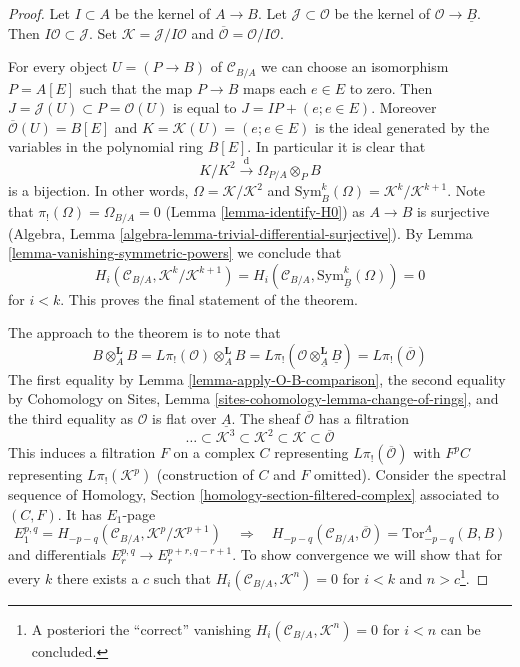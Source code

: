\documentclass[10pt,a4paper]{amsart}
\theoremstyle{plain}
\theoremstyle{definition}
\theoremstyle{remark}
\numberwithin{equation}{subsection}
\begin{document}
\begin{proof}
Let $I \subset A$ be the kernel of $A \to B$. Let
$\mathcal{J} \subset \mathcal{O}$
be the kernel of $\mathcal{O} \to \underline{B}$. Then
$I\mathcal{O} \subset \mathcal{J}$. Set
$\mathcal{K} = \mathcal{J}/I\mathcal{O}$ and
$\overline{\mathcal{O}} = \mathcal{O}/I\mathcal{O}$.

\medskip\noindent
For every object $U = (P \to B)$ of $\mathcal{C}_{B/A}$
we can choose an isomorphism $P = A[E]$ such that the map
$P \to B$ maps each $e \in E$ to zero. Then
$J = \mathcal{J}(U) \subset P = \mathcal{O}(U)$
is equal to $J = IP + (e; e \in E)$. Moreover
$\overline{\mathcal{O}}(U) = B[E]$ and $K = \mathcal{K}(U) = (e; e \in E)$
is the ideal generated by the variables in the polynomial ring $B[E]$.
In particular it is clear that
$$
K/K^2 \xrightarrow{\text{d}} \Omega_{P/A} \otimes_P B
$$
is a bijection. In other words, $\Omega = \mathcal{K}/\mathcal{K}^2$
and $\text{Sym}_B^k(\Omega) = \mathcal{K}^k/\mathcal{K}^{k + 1}$.
Note that $\pi_!(\Omega) = \Omega_{B/A} = 0$ (Lemma \ref{lemma-identify-H0})
as $A \to B$ is surjective
(Algebra, Lemma \ref{algebra-lemma-trivial-differential-surjective}).
By Lemma \ref{lemma-vanishing-symmetric-powers} we conclude that
$$
H_i(\mathcal{C}_{B/A}, \mathcal{K}^k/\mathcal{K}^{k + 1}) =
H_i(\mathcal{C}_{B/A}, \text{Sym}^k_{\underline{B}}(\Omega)) = 0
$$
for $i < k$. This proves the final statement of the theorem.

\medskip\noindent
The approach to the theorem is to note that
$$
B \otimes_A^\mathbf{L} B = L\pi_!(\mathcal{O}) \otimes_A^\mathbf{L} B =
L\pi_!(\mathcal{O} \otimes_{\underline{A}}^\mathbf{L} \underline{B}) =
L\pi_!(\overline{\mathcal{O}})
$$
The first equality by Lemma \ref{lemma-apply-O-B-comparison},
the second equality by
Cohomology on Sites, Lemma \ref{sites-cohomology-lemma-change-of-rings}, and
the third equality as $\mathcal{O}$ is flat over $\underline{A}$.
The sheaf $\overline{\mathcal{O}}$ has a filtration
$$
\ldots \subset
\mathcal{K}^3 \subset
\mathcal{K}^2 \subset
\mathcal{K} \subset
\overline{\mathcal{O}}
$$
This induces a filtration $F$ on a complex $C$ representing
$L\pi_!(\overline{\mathcal{O}})$ with $F^pC$ representing
$L\pi_!(\mathcal{K}^p)$ (construction of $C$ and $F$ omitted).
Consider the spectral sequence of
Homology, Section \ref{homology-section-filtered-complex}
associated to $(C, F)$. It has $E_1$-page
$$
E_1^{p, q} = H_{- p - q}(\mathcal{C}_{B/A}, \mathcal{K}^p/\mathcal{K}^{p + 1})
\quad\Rightarrow\quad
H_{- p - q}(\mathcal{C}_{B/A}, \overline{\mathcal{O}}) = 
\text{Tor}_{- p - q}^A(B, B)
$$
and differentials $E_r^{p, q} \to E_r^{p + r, q - r + 1}$. To show convergence
we will show that for every $k$ there exists a $c$ such that
$H_i(\mathcal{C}_{B/A}, \mathcal{K}^n) = 0$
for $i < k$ and $n > c$\footnote{A posteriori
the ``correct'' vanishing $H_i(\mathcal{C}_{B/A}, \mathcal{K}^n) = 0$ for
$i < n$ can be concluded.}.


\end{proof}
\end{document}
